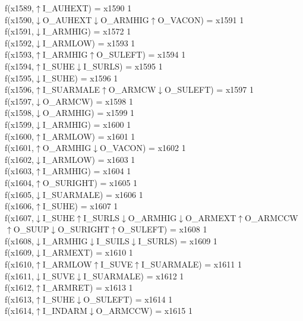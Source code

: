 f(x1589,$\uparrow$I\_AUHEXT) = x1590 {1} \\
f(x1590,$\downarrow$O\_AUHEXT$\downarrow$O\_ARMHIG$\uparrow$O\_VACON) = x1591 {1} \\
f(x1591,$\downarrow$I\_ARMHIG) = x1572 {1} \\
f(x1592,$\downarrow$I\_ARMLOW) = x1593 {1} \\
f(x1593,$\uparrow$I\_ARMHIG$\uparrow$O\_SULEFT) = x1594 {1} \\
f(x1594,$\uparrow$I\_SUHE$\downarrow$I\_SURLS) = x1595 {1} \\
f(x1595,$\downarrow$I\_SUHE) = x1596 {1} \\
f(x1596,$\uparrow$I\_SUARMALE$\uparrow$O\_ARMCW$\downarrow$O\_SULEFT) = x1597 {1} \\
f(x1597,$\downarrow$O\_ARMCW) = x1598 {1} \\
f(x1598,$\downarrow$O\_ARMHIG) = x1599 {1} \\
f(x1599,$\downarrow$I\_ARMHIG) = x1600 {1} \\
f(x1600,$\uparrow$I\_ARMLOW) = x1601 {1} \\
f(x1601,$\uparrow$O\_ARMHIG$\downarrow$O\_VACON) = x1602 {1} \\
f(x1602,$\downarrow$I\_ARMLOW) = x1603 {1} \\
f(x1603,$\uparrow$I\_ARMHIG) = x1604 {1} \\
f(x1604,$\uparrow$O\_SURIGHT) = x1605 {1} \\
f(x1605,$\downarrow$I\_SUARMALE) = x1606 {1} \\
f(x1606,$\uparrow$I\_SUHE) = x1607 {1} \\
f(x1607,$\downarrow$I\_SUHE$\uparrow$I\_SURLS$\downarrow$O\_ARMHIG$\downarrow$O\_ARMEXT$\uparrow$O\_ARMCCW$\uparrow$O\_SUUP$\downarrow$O\_SURIGHT$\uparrow$O\_SULEFT) = x1608 {1} \\
f(x1608,$\downarrow$I\_ARMHIG$\downarrow$I\_SUILS$\downarrow$I\_SURLS) = x1609 {1} \\
f(x1609,$\downarrow$I\_ARMEXT) = x1610 {1} \\
f(x1610,$\uparrow$I\_ARMLOW$\uparrow$I\_SUVE$\uparrow$I\_SUARMALE) = x1611 {1} \\
f(x1611,$\downarrow$I\_SUVE$\downarrow$I\_SUARMALE) = x1612 {1} \\
f(x1612,$\uparrow$I\_ARMRET) = x1613 {1} \\
f(x1613,$\uparrow$I\_SUHE$\downarrow$O\_SULEFT) = x1614 {1} \\
f(x1614,$\uparrow$I\_INDARM$\downarrow$O\_ARMCCW) = x1615 {1} \\
